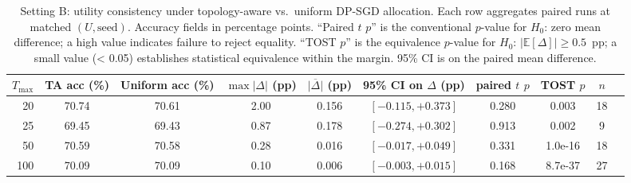 \begin{table}[t]
\centering
\caption{Setting B: utility consistency under topology-aware vs.\ uniform DP-SGD allocation. Each row aggregates paired runs at matched $(U, \text{seed})$. Accuracy fields in percentage points. ``Paired $t$ $p$'' is the conventional $p$-value for $H_0$: zero mean difference; a high value indicates failure to reject equality. ``TOST $p$'' is the equivalence $p$-value for $H_0$: $|\mathbb{E}[\Delta]|\ge 0.5$~pp; a small value (< 0.05) establishes statistical equivalence within the margin. 95\% CI is on the paired mean difference.}
\label{tab:util-consistency-b}
\begin{tabular}{@{}rccccccccc@{}}
\toprule
$T_{\max}$ & TA acc (\%) & Uniform acc (\%) & $\max|\Delta|$ (pp) & $\overline{|\Delta|}$ (pp) & 95\% CI on $\Delta$ (pp) & paired $t$ $p$ & TOST $p$ & $n$ \\
\midrule
20 & 70.74 & 70.61 & 2.00 & 0.156 & $[-0.115, +0.373]$ & 0.280 & 0.003 & 18 \\
25 & 69.45 & 69.43 & 0.87 & 0.178 & $[-0.274, +0.302]$ & 0.913 & 0.002 & 9 \\
50 & 70.59 & 70.58 & 0.28 & 0.016 & $[-0.017, +0.049]$ & 0.331 & 1.0e-16 & 18 \\
100 & 70.09 & 70.09 & 0.10 & 0.006 & $[-0.003, +0.015]$ & 0.168 & 8.7e-37 & 27 \\
\bottomrule
\end{tabular}
\end{table}
